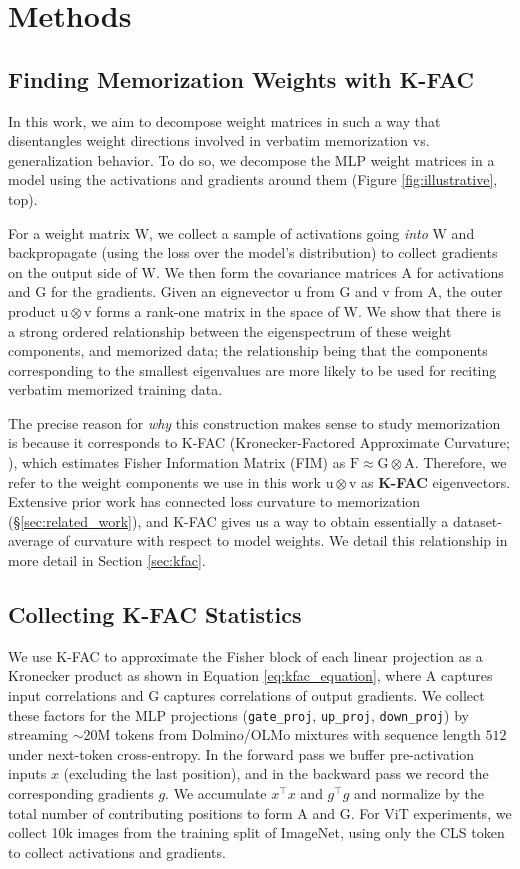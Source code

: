 \documentclass{article} %
\newcommand{\matr}[1]{\ensuremath{\bm{\mathrm{#1}}}}
\newcommand{\kfac}{\ensuremath{\matr{F}\approx\matr{G} \otimes \matr{A}}}
\begin{document}
\section{Methods}
\subsection{Finding Memorization Weights with K-FAC}
In this work, we aim to decompose weight matrices in such a way that disentangles weight directions involved in verbatim memorization vs. generalization behavior. To do so, we decompose the MLP weight matrices in a model using the activations and gradients around them (Figure \ref{fig:illustrative}, top).  

For a weight matrix \matr{W}, we collect a sample of activations going \textit{into} \matr{W} and backpropagate (using the loss over the model's distribution) to collect gradients on the output side of \matr{W}. We then form the covariance matrices \matr{A} for activations and \matr{G} for the gradients. Given an eignevector \matr{u} from \matr{G} and \matr{v} from \matr{A}, the outer product $\matr{u} \otimes \matr{v}$ forms a rank-one matrix in the space of \matr{W}. We show that there is a strong ordered relationship between the eigenspectrum of these weight components, and memorized data; the relationship being that the components corresponding to the smallest eigenvalues are more likely to be used for reciting verbatim memorized training data. 

The precise reason for \textit{why} this construction makes sense to study memorization is because it corresponds to K-FAC (Kronecker-Factored Approximate Curvature; \citet{martens2015optimizing}), which estimates Fisher Information Matrix (FIM) as \kfac. Therefore, we refer to the weight components we use in this work $\matr{u} \otimes \matr{v}$ as \textbf{K-FAC} eigenvectors. Extensive prior work has connected loss curvature to memorization (\S\ref{sec:related_work}), and K-FAC gives us a way to obtain essentially a dataset-average of curvature with respect to model weights. We detail this relationship in more detail in Section \ref{sec:kfac}.

\subsection{Collecting K-FAC Statistics}
We use K-FAC to approximate the
Fisher block of each linear projection as a Kronecker product as shown in Equation \ref{eq:kfac_equation},
where \matr{A} captures input correlations and \matr{G} captures correlations of
output gradients. We collect these factors for the MLP projections
(\texttt{gate\_proj}, \texttt{up\_proj}, \texttt{down\_proj})
 by streaming $\sim$20M tokens from Dolmino/OLMo
mixtures with sequence length $512$ under next-token cross-entropy. In
the forward pass we buffer pre-activation inputs $x$ (excluding the last
position), and in the backward pass we record the corresponding
gradients $g$. We accumulate $x^\top x$ and $g^\top g$ and
normalize by the total number of contributing positions to form \matr{A} and \matr{G}. For ViT experiments, we collect 10k images from the training split of ImageNet, using only the CLS token to collect activations and gradients. 
\end{document}
